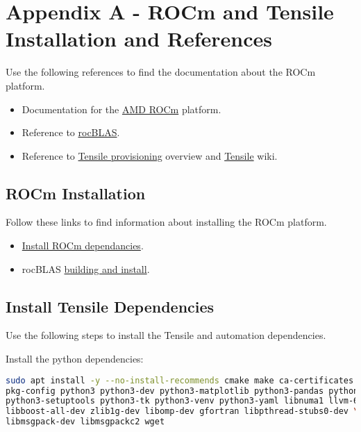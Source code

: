 \documentclass[]{article}
\begin{document}
\section{Appendix A - ROCm and Tensile Installation and References}
\label{sec:appendixA}

Use the following references to find the documentation about the ROCm platform.
\begin{itemize}
	\item Documentation for the \href{https://rocmdocs.amd.com/en/latest/}{AMD ROCm} platform.
	\item Reference to \href{https://rocblas.readthedocs.io/en/latest/intro.html}{rocBLAS}.
	\item Reference to \href{https://github.com/ROCmSoftwarePlatform/Tensile/tree/develop/tuning}{Tensile provisioning} overview and \href{https://github.com/ROCmSoftwarePlatform/Tensile/wiki}{Tensile} wiki.
\end{itemize}

\subsection{ROCm Installation}

Follow these links to find information about installing the ROCm platform. \newline

\begin{itemize}
	\item \href{https://rocmdocs.amd.com/en/latest/Installation_Guide/Installation-Guide.html}{Install ROCm dependancies}.
	\item rocBLAS \href{https://rocblas.readthedocs.io/en/latest/install.html}{building and install}.
\end{itemize}

\subsection{Install Tensile Dependencies}

Use the following steps to install the Tensile and automation dependencies. \newline

\noindent Install the python dependencies:

\begin{lstlisting}[language=bash,breaklines=true]
sudo apt install -y --no-install-recommends cmake make ca-certificates git \
pkg-config python3 python3-dev python3-matplotlib python3-pandas python3-pip \
python3-setuptools python3-tk python3-venv python3-yaml libnuma1 llvm-6.0-dev \
libboost-all-dev zlib1g-dev libomp-dev gfortran libpthread-stubs0-dev \ 
libmsgpack-dev libmsgpackc2 wget
\end{lstlisting}
\end{document}

